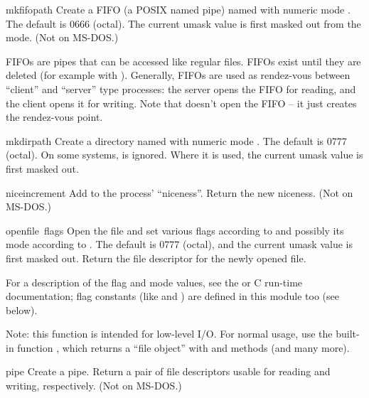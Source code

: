 \begin{funcdesc}{mkfifo}{path}
Create a FIFO (a POSIX named pipe) named  with numeric mode
.  The default  is 0666 (octal).  The current
umask value is first masked out from the mode.
(Not on MS-DOS.)

FIFOs are pipes that can be accessed like regular files.  FIFOs exist
until they are deleted (for example with ).
Generally, FIFOs are used as rendez-vous between ``client'' and
``server'' type processes: the server opens the FIFO for reading, and
the client opens it for writing.  Note that  doesn't
open the FIFO -- it just creates the rendez-vous point.
\end{funcdesc}

\begin{funcdesc}{mkdir}{path}
Create a directory named  with numeric mode .
The default  is 0777 (octal).  On some systems, 
is ignored.  Where it is used, the current umask value is first
masked out.
\end{funcdesc}

\begin{funcdesc}{nice}{increment}
Add  to the process' ``niceness''.  Return the new niceness.
(Not on MS-DOS.)
\end{funcdesc}

\begin{funcdesc}{open}{file\, flags}
Open the file  and set various flags according to
 and possibly its mode according to .
The default  is 0777 (octal), and the current umask value is
first masked out.  Return the file descriptor for the newly opened
file.

For a description of the flag and mode values, see the \UNIX{} or C
run-time documentation; flag constants (like  and
) are defined in this module too (see below).

Note: this function is intended for low-level I/O.  For normal usage,
use the built-in function , which returns a ``file object''
with  and   methods (and many more).
\end{funcdesc}

\begin{funcdesc}{pipe}{}
Create a pipe.  Return a pair of file descriptors 
usable for reading and writing, respectively.
(Not on MS-DOS.)
\end{funcdesc}

